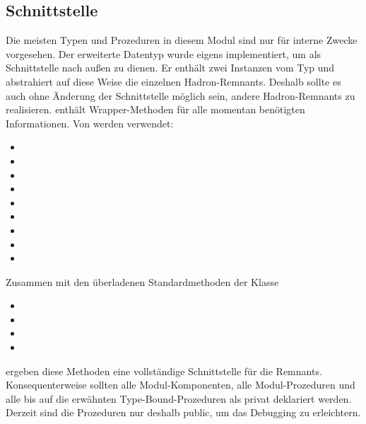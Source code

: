 \subsection{Schnittstelle}
Die meisten Typen und Prozeduren in diesem Modul sind nur für interne Zwecke vorgesehen. Der erweiterte Datentyp  wurde eigens implementiert, um als Schnittstelle nach außen zu dienen. Er enthält zwei Instanzen vom Typ  und abstrahiert auf diese Weise die einzelnen Hadron-Remnants. Deshalb sollte es auch ohne Änderung der Schnittstelle möglich sein, andere Hadron-Remnants zu realisieren.  enthält Wrapper-Methoden für alle momentan benötigten Informationen. Von  werden verwendet:
\begin{itemize}
\item {}
\item {}
\item {}
\item {}
\item {}
\item {}
\item {}
\item {}
\item {}
\end{itemize}
Zusammen mit den überladenen Standardmethoden der Klasse 
\begin{itemize}
\item {}
\item {}
\item {}
\item {}
\end{itemize}
ergeben diese Methoden eine vollständige Schnittstelle für die Remnants. Konsequenterweise sollten alle Modul-Komponenten, alle Modul-Prozeduren und alle bis auf die erwähnten Type-Bound-Prozeduren als privat deklariert werden. Derzeit sind die Prozeduren nur deshalb public, um das Debugging zu erleichtern.
